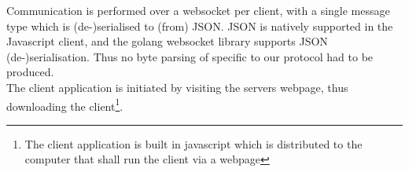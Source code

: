 Communication is performed over a websocket per client, with a single message type which is (de-)serialised to (from) JSON. JSON is natively supported in the Javascript client, and the golang websocket library supports JSON (de-)serialisation. Thus no byte parsing of specific to our protocol had to be produced.
\\
The client application is initiated by visiting the servers webpage, thus downloading the client\footnote{The client application is built in javascript which is distributed to the computer that shall run the client via a webpage}. 





